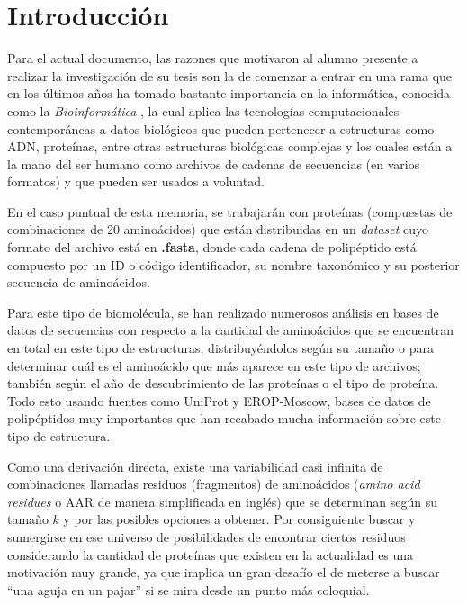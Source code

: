 \chapter*{Introducci\'on}

Para el actual documento, las razones que motivaron al alumno presente a realizar la investigación de su tesis son la de comenzar a 
entrar en una rama que en los últimos años ha tomado bastante importancia en la informática, conocida como la {\textit{Bioinformática}} \cite{bioinformatica}, la cual aplica las tecnologías computacionales contemporáneas a datos biológicos que pueden pertenecer a estructuras como ADN, proteínas, entre otras estructuras biológicas complejas y los cuales están a la mano del ser humano como archivos de cadenas de secuencias (en varios formatos) y que pueden ser usados a voluntad.

En el caso puntual de esta memoria, se trabajarán con proteínas (compuestas de combinaciones de 20 aminoácidos) que están distribuidas en un {\textit{dataset}} cuyo formato del archivo está en \textbf{.fasta}, donde cada cadena de polipéptido está compuesto por un ID o código identificador, su nombre taxonómico y su posterior secuencia de aminoácidos. 

Para este tipo de biomolécula, se han realizado numerosos análisis \cite{searching, array} en bases de datos de secuencias con respecto a la cantidad de aminoácidos que se encuentran en total en este tipo de estructuras, distribuyéndolos según su tamaño o para determinar cuál es el aminoácido que más aparece en este tipo de archivos; también según el año de descubrimiento de las proteínas o el tipo de proteína. Todo esto usando fuentes como UniProt y EROP-Moscow, bases de datos de polipéptidos muy importantes que han recabado mucha información sobre este tipo de estructura. 

Como una derivación directa, existe una variabilidad casi infinita de combinaciones llamadas residuos (fragmentos) de aminoácidos ({\textit{amino acid residues}} o AAR de manera simplificada en inglés) que se determinan según su tamaño $k$ y por las posibles opciones a obtener. Por consiguiente buscar y sumergirse en ese universo de posibilidades de encontrar ciertos residuos considerando la cantidad de proteínas que existen en la actualidad es una motivación muy grande, ya que implica un gran desafío el de meterse a buscar ``una aguja en un pajar'' si se mira desde un punto más coloquial.